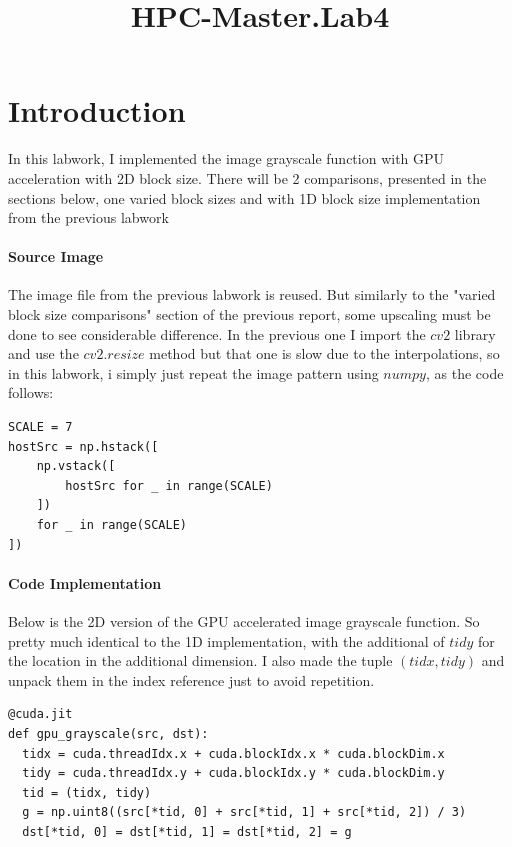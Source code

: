 \documentclass[]{article}
\title{HPC-Master.Lab4}
\begin{document}
\maketitle

\setlength{\parindent}{0pt}
\setlength{\parskip}{3pt}

\section{Introduction}
In this labwork, I implemented the image grayscale function with GPU acceleration with 2D block size.
There will be 2 comparisons, presented in the sections below, one varied block sizes and with 1D block size implementation from the previous labwork

\paragraph{Source Image}
The image file from the previous labwork is reused. But similarly to the "varied block size comparisons" section of the previous report, some upscaling must be done to see considerable difference.
In the previous one I import the $cv2$ library and use the $cv2.resize$ method but that one is slow due to the interpolations, so in this labwork, i simply just repeat the image pattern using $numpy$, as the code follows:
\begin{verbatim}
SCALE = 7
hostSrc = np.hstack([
    np.vstack([
        hostSrc for _ in range(SCALE)
    ])
    for _ in range(SCALE)
])
\end{verbatim}

\paragraph{Code Implementation}
Below is the 2D version of the GPU accelerated image grayscale function. So pretty much identical to the 1D implementation, with the additional of $tidy$ for the location in the additional dimension. I also made the tuple $(tidx, tidy)$ and unpack them in the index reference just to avoid repetition.
\begin{verbatim}
@cuda.jit
def gpu_grayscale(src, dst):
  tidx = cuda.threadIdx.x + cuda.blockIdx.x * cuda.blockDim.x
  tidy = cuda.threadIdx.y + cuda.blockIdx.y * cuda.blockDim.y
  tid = (tidx, tidy)
  g = np.uint8((src[*tid, 0] + src[*tid, 1] + src[*tid, 2]) / 3)
  dst[*tid, 0] = dst[*tid, 1] = dst[*tid, 2] = g
\end{verbatim}
\end{document}
